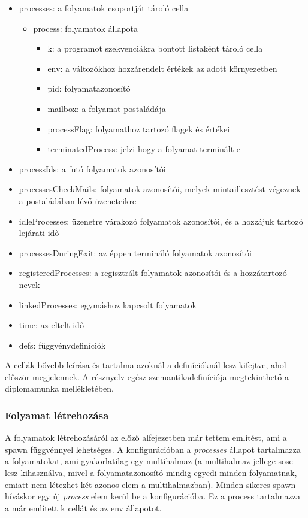 \begin{itemize}
  \item processes: a folyamatok csoportját tároló cella
  \begin{itemize}
    \item process: folyamatok állapota
    \begin{itemize}
      \item k: a programot szekvenciákra bontott listaként tároló cella
      \item env: a változókhoz hozzárendelt értékek az adott környezetben
      \item pid: folyamatazonosító
      \item mailbox: a folyamat postaládája
      \item processFlag: folyamathoz tartozó flagek és értékei
      \item terminatedProcess: jelzi hogy a folyamat terminált-e
    \end{itemize}
  \end{itemize}
  \item processIds: a futó folyamatok azonosítói
  \item processesCheckMails: folyamatok azonosítói, melyek mintaillesztést végeznek a postaládában lévő üzeneteikre
  \item idleProcesses: üzenetre várakozó folyamatok azonosítói, és a hozzájuk tartozó lejárati idő
  \item processesDuringExit: az éppen termináló folyamatok azonosítói
  \item registeredProcesses: a regisztrált folyamatok azonosítói és a hozzátartozó nevek
  \item linkedProcesses: egymáshoz kapcsolt folyamatok
  \item time: az eltelt idő
  \item defs: függvénydefiníciók
\end{itemize}

A cellák bővebb leírása és tartalma azoknál a definícióknál lesz kifejtve, ahol először megjelennek. A résznyelv egész szemantikadefiníciója megtekinthető a diplomamunka mellékletében.

\subsubsection{Folyamat létrehozása}
A folyamatok létrehozásáról az előző alfejezetben már tettem említést, ami a spawn függvénnyel lehetséges. A konfigurációban a \textit{processes} állapot tartalmazza a folyamatokat, ami gyakorlatilag egy multihalmaz (a multihalmaz jellege sose lesz kihasználva, mivel a folyamatazonosító mindig egyedi minden folyamatnak, emiatt nem létezhet két azonos elem a multihalmazban). Minden sikeres spawn híváskor egy új \textit{process} elem kerül be a konfigurációba. Ez a process tartalmazza a már említett k cellát és az env állapotot.

